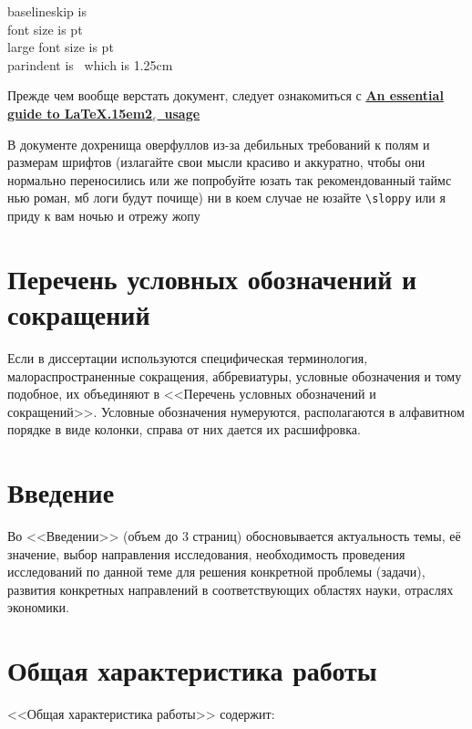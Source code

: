 \documentclass{mpaper}
\renewcommand{\LaTeXe}{\LaTeX\kern.15em2$_{\textstyle\varepsilon}$}
\begin{document}
    \maketitle
    \setcounter{tocdepth}{3}
    \setcounter{page}{2}
    \tableofcontents

    \newpage
    \noindent baselineskip is \the\baselineskip\\
    font size is \makeatletter\f@size\makeatother pt\\
    large font size is {\normalsizerrr \makeatletter\f@size\makeatother} pt\\
    parindent is \the\parindent\ which is 1.25cm

    Прежде чем вообще верстать документ, следует ознакомиться с \href{http://anorien.csc.warwick.ac.uk/mirrors/CTAN/info/l2tabu/english/l2tabuen.pdf}{\bfseries An essential guide to \LaTeXe\ usage}

    В документе дохренища оверфуллов из-за дебильных требований к полям и размерам шрифтов (излагайте свои мысли красиво и аккуратно, чтобы они нормально переносились или же попробуйте юзать так рекомендованный таймс нью роман, мб логи будут почище) ни в коем случае не юзайте \verb|\sloppy| или я приду к вам ночью и отрежу жопу
    \chapter*{Перечень условных обозначений и сокращений}
    Если в диссертации используются специфическая терминология, малораспространенные сокращения, аббревиатуры, условные обозначения и тому подобное, их объединяют в <<Перечень условных обозначений и сокращений>>. Условные обозначения нумеруются, располагаются в алфавитном порядке в виде колонки, справа от них дается их расшифровка.
    \chapter*{Введение}
    Во <<Введении>> (объем до 3 страниц) обосновывается актуальность темы, её значение, выбор направления исследования, необходимость проведения исследований по данной теме для решения конкретной проблемы (задачи), развития конкретных направлений в соответствующих областях науки, отраслях экономики.

    \chapter{Общая характеристика работы}
    <<Общая характеристика работы>> содержит:
\end{document}
